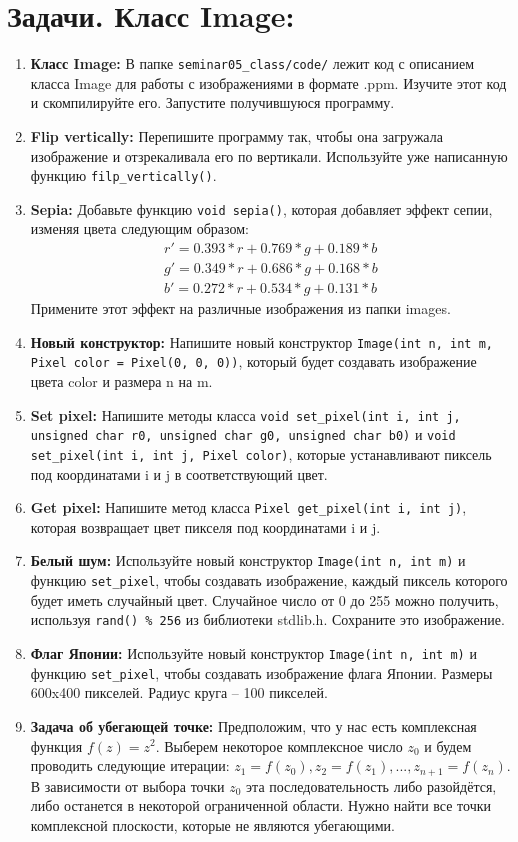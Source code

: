 \documentclass{article}
\begin{document}
\section*{Задачи. Класс Image:}
\begin{enumerate}
\item \textbf{Класс Image:} В папке \texttt{seminar05\_class/code/} лежит код с описанием класса Image для работы с изображениями в формате .ppm. Изучите этот код и скомпилируйте его. Запустите получившуюся программу.
\item \textbf{Flip vertically:} Перепишите программу так, чтобы она загружала изображение и отзрекаливала его по вертикали. Используйте уже написанную функцию \texttt{filp\_vertically()}.
\item \textbf{Sepia:} Добавьте функцию \texttt{void sepia()}, которая добавляет эффект сепии, изменяя цвета следующим образом:
\begin{equation}
\begin{aligned}
  r' = 0.393*r + 0.769*g + 0.189*b \\ 
  g' = 0.349*r + 0.686*g + 0.168*b \\ 
  b' = 0.272*r + 0.534*g + 0.131*b
\end{aligned}
\end{equation}
Примените этот эффект на различные изображения из папки images.
\item \textbf{Новый конструктор:} Напишите новый конструктор \texttt{Image(int n, int m, Pixel color = Pixel(0, 0, 0))}, который будет создавать изображение цвета color и размера n на m.
\item \textbf{Set pixel:} Напишите методы класса \texttt{void set\_pixel(int i, int j, unsigned char r0, unsigned char g0, unsigned char b0)} и \texttt{void set\_pixel(int i, int j, Pixel color)}, которые устанавливают пиксель под координатами i и j в соответствующий цвет.
\item \textbf{Get pixel:} Напишите метод класса \texttt{Pixel get\_pixel(int i, int j)}, которая возвращает цвет пикселя под координатами i и j.
\item \textbf{Белый шум:} Используйте новый конструктор \texttt{Image(int n, int m)} и функцию \texttt{set\_pixel}, чтобы создавать изображение, каждый пиксель которого будет иметь случайный цвет. Случайное число от 0 до 255 можно получить, используя \texttt{rand() \% 256} из библиотеки stdlib.h. Сохраните это изображение.
\item \textbf{Флаг Японии:} Используйте новый конструктор \texttt{Image(int n, int m)} и функцию \texttt{set\_pixel}, чтобы создавать изображение флага Японии. Размеры 600x400 пикселей. Радиус круга -- 100 пикселей.
\newpage
\item \textbf{Задача об убегающей точке:} Предположим, что у нас есть комплексная функция $f(z) = z^2$. Выберем некоторое комплексное число $z_0$ и будем проводить следующие итерации: $z_1 = f(z_0), z_2 = f(z_1), ..., z_{n+1} = f(z_n)$. В зависимости от выбора точки $z_0$ эта последовательность либо разойдётся, либо останется в некоторой ограниченной области. Нужно найти все точки комплексной плоскости, которые не являются убегающими. \\


\end{enumerate}
\end{document}

